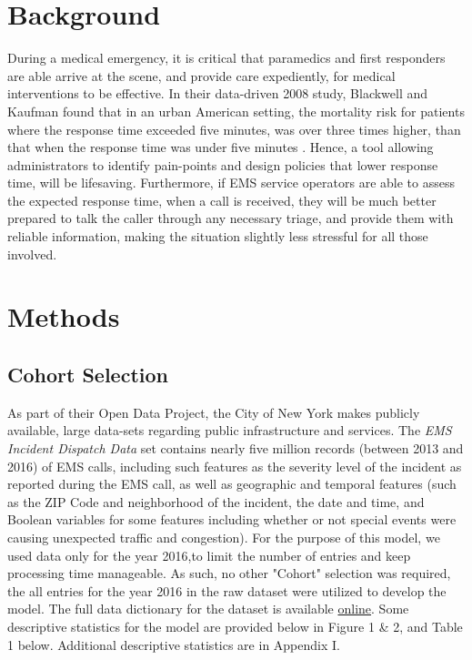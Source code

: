 \documentclass[twoside,11pt]{article}
\begin{document}
\section{Background}
During a medical emergency, it is critical that paramedics and first responders are able arrive at the scene, and provide care expediently, for medical interventions to be effective. In their data-driven 2008 study, Blackwell and Kaufman found that in an urban American setting, the mortality risk for patients where the response time exceeded five minutes, was over three times higher, than that when the response time was under five minutes \cite{blackwellrte}. Hence, a tool allowing administrators to identify pain-points and design policies that lower response time, will be lifesaving. Furthermore, if EMS service operators are able to assess the expected response time, when a call is received, they will be much better prepared to talk the caller through any necessary triage, and provide them with reliable information, making the situation slightly less stressful for all those involved.

\section{Methods}
\subsection{Cohort Selection}

As part of their Open Data Project, the City of New York makes publicly available, large data-sets regarding public infrastructure and services. The \emph{EMS Incident Dispatch Data} set contains nearly five million records (between 2013 and 2016) of EMS calls, including such features as  the severity level of the incident as reported during the EMS call, as well as geographic and temporal features (such as the ZIP Code and neighborhood of the incident, the date and time, and Boolean variables for some features including whether or not special events were causing unexpected traffic and congestion). For the purpose of this model, we used data only for the year 2016,to limit the number of entries and keep processing time manageable. As such, no other "Cohort" selection was required, the all entries for the year 2016 in the raw dataset were utilized to develop the model. The full data dictionary for the dataset is available \href{https://data.cityofnewyork.us/Public-Safety/EMS-Incident-Dispatch-Data/76xm-jjuj)}{online}.
Some descriptive statistics for the model are provided below in Figure 1 \& 2, and Table 1 below. Additional descriptive statistics are in Appendix I.
\end{document}
